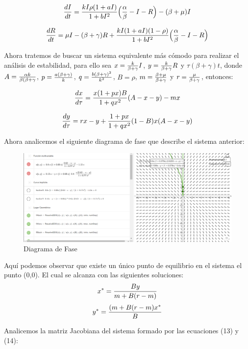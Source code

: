 \documentclass{article}
\begin{document}
\begin{equation}
	{dI\over dt}={kI\rho (1+aI)\over 1+bI^2}\Big({\alpha\over\beta}-I-R\Big)-(\beta+\mu)I
\end{equation}

\begin{equation}
	{dR\over dt}=\mu I-(\beta+\gamma)R+{kI(1+aI)(1-\rho)\over 1+bI^2}\Big({\alpha\over\beta}-I-R\Big)
\end{equation}

Ahora tratemos de buscar un sistema equivalente m\'as c\'omodo para realizar el an\'alisis de estabilidad, para ello sea $x={k\over \beta +\gamma}I$, $y={k\over \beta +\gamma}R$ y $\tau (\beta+\gamma)t$, donde $A={\alpha k\over \beta(\beta+\gamma}$, $p={a(\beta+\gamma)\over k}$, $q={b(\beta+\gamma)^2\over k^2}$, $B=\rho$, $m={\beta+\mu\over \beta+\gamma}$ y $r={\mu\over \beta+\gamma}$, entonces:

\begin{equation}
	{dx\over d\tau}={x(1+px)B\over 1+qx^2}(A-x-y)-mx
\end{equation}

\begin{equation}
	{dy\over d\tau}=rx-y+{1+px\over 1+qx^2}(1-B)x(A-x-y)
\end{equation}

Ahora analicemos el siguiente diagrama de fase que describe el sistema anterior:

\begin{figure}[H]
    \centering
    \includegraphics[width=1\textwidth]{./images/Figure_2.png}
    \caption{Diagrama de Fase}
    \label{fig:model_graph}
\end{figure}

Aqu\'i podemos observar que existe un \'unico punto de equilibrio en el sistema el punto (0,0). El cual se alcanza con las siguientes soluciones: $$x^*={By\over m+B(r-m)}$$ $$y^*={(m+B(r-m)x^*\over B}$$

Analicemos la matriz Jacobiana del sistema formado por las ecuaciones (13) y (14):
\end{document}
